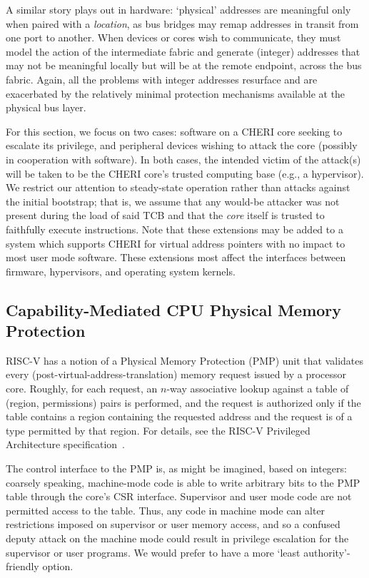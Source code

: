 A similar story plays out in hardware: `physical' addresses are meaningful
only when paired with a \emph{location}, as bus bridges may remap addresses
in transit from one port to another.  When devices or cores wish to
communicate, they must model the action of the intermediate fabric and
generate (integer) addresses that may not be meaningful locally but will be
at the remote endpoint, across the bus fabric.  Again, all the problems with
integer addresses resurface and are exacerbated by the relatively minimal
protection mechanisms available at the physical bus layer.

For this section, we focus on two cases: software on a CHERI core seeking to
escalate its privilege, and peripheral devices wishing to attack the core
(possibly in cooperation with software).  In both cases, the intended victim
of the attack(s) will be taken to be the CHERI core's trusted computing base
(e.g., a hypervisor).  We restrict our attention to steady-state operation
rather than attacks against the initial bootstrap; that is, we assume that
any would-be attacker was not present during the load of said TCB and that
the \emph{core} itself is trusted to faithfully execute instructions.
Note that these extensions may be added to a system which supports
CHERI for virtual address pointers with no impact to most user mode
software.  These extensions most affect the interfaces between
firmware, hypervisors, and operating system kernels.

\subsection{Capability-Mediated CPU Physical Memory Protection} %

RISC-V has a notion of a Physical Memory Protection (PMP) unit that
validates every (post-virtual-address-translation) memory request issued by
a processor core.  Roughly, for each request, an $n$-way associative lookup
against a table of (region, permissions) pairs is performed, and the request
is authorized only if the table contains a region containing the requested
address and the request is of a type permitted by that region.  For details,
see the RISC-V Privileged Architecture specification~\cite[\S
3.6]{RISCV:Privileged:1.10}.

The control interface to the PMP is, as might be imagined, based on
integers: coarsely speaking, machine-mode code is able to write arbitrary
bits to the PMP table through the core's CSR interface.  Supervisor and user
mode code are not permitted access to the table.  Thus, any code in machine
mode can alter restrictions imposed on supervisor or user memory access, and
so a confused deputy attack on the machine mode could result in privilege
escalation for the supervisor or user programs.  We would prefer to have a
more `least authority'-friendly option.

